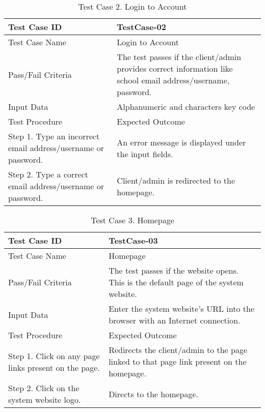 \newpage
\begin{table}[h!]   %
\centering
\caption{Test Case 2.  Login to Account} \vspace{0.25em}
\begin{tabular}{|p{2in}|p{4in}|} \hline
\centering 
Test Case ID & TestCase-02 \\ \hline
Test Case Name       &   Login to Account    \\ \hline
Pass/Fail Criteria       &   The test passes if the client/admin provides correct information like school email address/username, password.     \\ \hline
Input Data  &  Alphanumeric and characters key code  \\ \hline
Test Procedure   & Expected Outcome  \\ \hline
Step 1. Type an incorrect email address/username or password.         &    An error message is displayed under the input fields.    \\ \hline
Step 2. Type a correct email address/username or password.   & Client/admin is redirected to the homepage.     \\ \hline
\end{tabular}
\label{tab:test2}
\end{table}



\begin{table}[h!]   %
\centering
\caption{Test Case 3. Homepage} \vspace{0.25em}
\begin{tabular}{|p{2in}|p{4in}|} \hline
\centering 
Test Case ID & TestCase-03 \\ \hline
Test Case Name       &   Homepage     \\ \hline
Pass/Fail Criteria       &   The test passes if the website opens. This is the default page of the system website.      \\ \hline
Input Data  &  Enter the system website’s URL into the browser with an Internet connection.   \\ \hline
Test Procedure   & Expected Outcome  \\ \hline
Step 1. Click on any page links present on the page.         &   Redirects the client/admin to the page linked to that page link present on the homepage.     \\ \hline
Step 2. Click on the system website logo.    & 	Directs to the homepage.      \\ \hline
\end{tabular}
\label{tab:test3}
\end{table}


